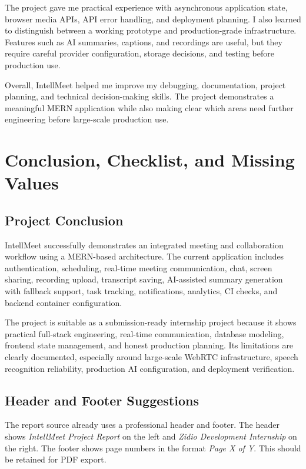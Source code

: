 \documentclass[11pt,a4paper]{article}
\begin{document}
The project gave me practical experience with asynchronous application state, browser media APIs, API error handling, and deployment planning. I also learned to distinguish between a working prototype and production-grade infrastructure. Features such as AI summaries, captions, and recordings are useful, but they require careful provider configuration, storage decisions, and testing before production use.

Overall, IntellMeet helped me improve my debugging, documentation, project planning, and technical decision-making skills. The project demonstrates a meaningful MERN application while also making clear which areas need further engineering before large-scale production use.

\newpage

\section{Conclusion, Checklist, and Missing Values}
\subsection{Project Conclusion}
IntellMeet successfully demonstrates an integrated meeting and collaboration workflow using a MERN-based architecture. The current application includes authentication, scheduling, real-time meeting communication, chat, screen sharing, recording upload, transcript saving, AI-assisted summary generation with fallback support, task tracking, notifications, analytics, CI checks, and backend container configuration.

The project is suitable as a submission-ready internship project because it shows practical full-stack engineering, real-time communication, database modeling, frontend state management, and honest production planning. Its limitations are clearly documented, especially around large-scale WebRTC infrastructure, speech recognition reliability, production AI configuration, and deployment verification.

\subsection{Header and Footer Suggestions}
The report source already uses a professional header and footer. The header shows \textit{IntellMeet Project Report} on the left and \textit{Zidio Development Internship} on the right. The footer shows page numbers in the format \textit{Page X of Y}. This should be retained for PDF export.
\end{document}
